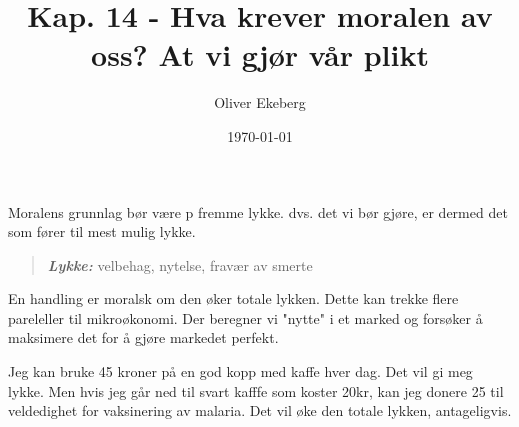 \documentclass[11pt, a4paper]{article}
\title{Kap. 14 - Hva krever moralen av oss? At vi gjør vår plikt}
\author{Oliver Ekeberg}
\date{\today}
\begin{document}
\maketitle

\tableofcontents


\begin{flushleft}
    Moralens grunnlag bør være p fremme lykke. dvs. det vi bør gjøre, er dermed det som fører til mest mulig lykke.

    \begin{quote}
        \textbf{\textit{Lykke:}} velbehag, nytelse, fravær av smerte
    \end{quote}

    En handling er moralsk om den øker totale lykken. Dette kan trekke flere pareleller til mikroøkonomi. Der beregner vi "nytte" i et marked og forsøker å maksimere det for å gjøre markedet perfekt.


    Jeg kan bruke 45 kroner på en god kopp med kaffe hver dag. Det vil gi meg lykke. Men hvis jeg går ned til svart kafffe som koster 20kr, kan jeg donere 25 til veldedighet for vaksinering av malaria. Det vil øke den totale lykken, antageligvis. 
\end{flushleft}
\end{document}
